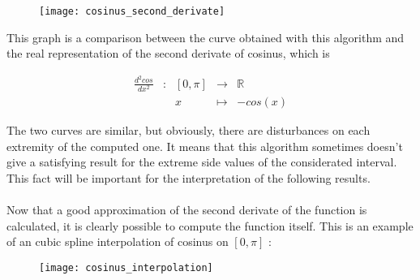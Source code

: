 \documentclass{article}
\begin{document}
\begin{figure}[h]
  \texttt{[image: cosinus\_second\_derivate]}
\end{figure}

This graph is a comparison between the curve obtained with this algorithm and the real representation of the second derivate of cosinus, which is

\begin{equation}
\begin{array}{ccccl}
\frac{d^2 cos}{dx^2} & : & [0, \pi] & \to & \mathbb{R} \\
 & & x & \mapsto & -cos(x)
\end{array}
\end{equation}

The two curves are similar, but obviously, there are disturbances on each extremity of the computed one. It means that this algorithm sometimes doesn't give a satisfying result for the extreme side values of the considerated interval. This fact will be important for the interpretation of the following results.\\\\

Now that a good approximation of the second derivate of the function is calculated, it is clearly possible to compute the function itself. This is an example of an cubic spline interpolation of cosinus on $[0, \pi]$ :

\begin{figure}[h]
  \texttt{[image: cosinus\_interpolation]}
\end{figure}
\end{document}
